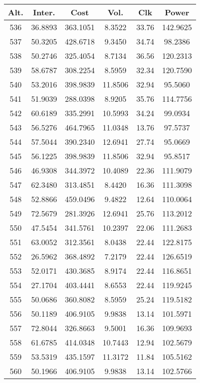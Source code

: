 \begin{center}
\begin{footnotesize}
\begin{tabular}{|c|ccccc|}
\hline
Alt. & Inter. & Cost & Vol. & Clk & Power\\
\hline
536 & 36.8893 & 363.1051 & 8.3522 & 33.76 & 142.9625 \\
537 & 50.3205 & 428.6718 & 9.3450 & 34.74 & 98.2386 \\
538 & 50.2746 & 325.4054 & 8.7134 & 36.56 & 120.2313 \\
539 & 58.6787 & 308.2254 & 8.5959 & 32.34 & 120.7590 \\
540 & 53.2016 & 398.9839 & 11.8506 & 32.94 & 95.5060 \\
541 & 51.9039 & 288.0398 & 8.9205 & 35.76 & 114.7756 \\
542 & 60.6189 & 335.2991 & 10.5993 & 34.24 & 99.0934 \\
543 & 56.5276 & 464.7965 & 11.0348 & 13.76 & 97.5737 \\
544 & 57.5044 & 390.2340 & 12.6941 & 27.74 & 95.0669 \\
545 & 56.1225 & 398.9839 & 11.8506 & 32.94 & 95.8517 \\
546 & 46.9308 & 344.3972 & 10.4089 & 22.36 & 111.9079 \\
547 & 62.3480 & 313.4851 & 8.4420 & 16.36 & 111.3098 \\
548 & 52.8866 & 459.0496 & 9.4822 & 12.64 & 110.0064 \\
549 & 72.5679 & 281.3926 & 12.6941 & 25.76 & 113.2012 \\
550 & 47.5454 & 341.5761 & 10.2397 & 22.06 & 111.2683 \\
551 & 63.0052 & 312.3561 & 8.0438 & 22.44 & 122.8175 \\
552 & 26.5962 & 368.4892 & 7.2179 & 22.44 & 126.6519 \\
553 & 52.0171 & 430.3685 & 8.9174 & 22.44 & 116.8651 \\
554 & 27.1704 & 403.4441 & 8.6553 & 22.44 & 119.9245 \\
555 & 50.0686 & 360.8082 & 8.5959 & 25.24 & 119.5182 \\
556 & 50.1189 & 406.9105 & 9.9838 & 13.14 & 101.5971 \\
557 & 72.8044 & 326.8663 & 9.5001 & 16.36 & 109.9693 \\
558 & 61.6785 & 414.0348 & 10.7443 & 12.94 & 102.5679 \\
559 & 53.5319 & 435.1597 & 11.3172 & 11.84 & 105.5162 \\
560 & 50.1966 & 406.9105 & 9.9838 & 13.14 & 102.5766 \\

\end{tabular}
\end{footnotesize}
\end{center}
